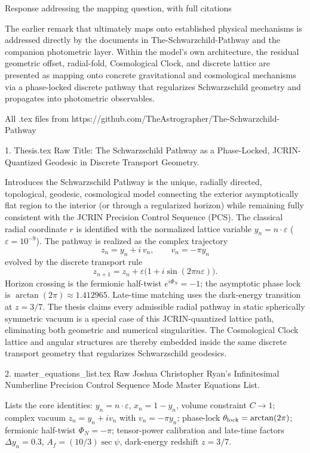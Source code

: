 Response addressing the mapping question, with full citations

The earlier remark that ultimately maps onto established physical mechanisms is addressed directly by the documents in The-Schwarzchild-Pathway and the companion photometric layer. Within the model’s own architecture, the residual geometric offset, radial-fold, Cosmological Clock, and discrete lattice are presented as mapping onto concrete gravitational and cosmological mechanisms via a phase-locked discrete pathway that regularizes Schwarzschild geometry and propagates into photometric observables.

All .tex files from https://github.com/TheAstrographer/The-Schwarzchild-Pathway

1. Thesis.tex  
Raw  
Title: The Schwarzschild Pathway as a Phase-Locked, JCRIN-Quantized Geodesic in Discrete Transport Geometry.  

Introduces the Schwarzschild Pathway is the unique, radially directed, topological, geodesic, cosmological model connecting the exterior asymptotically flat region to the interior (or through a regularized horizon) while remaining fully consistent with the JCRIN Precision Control Sequence (PCS). The classical radial coordinate \(r\) is identified with the normalized lattice variable \(y_n = n\cdot\varepsilon\) (\(\varepsilon=10^{-9}\)). The pathway is realized as the complex trajectory  
\[
z_n = y_n + i\,v_n,\qquad v_n = -\pi y_n
\]  
evolved by the discrete transport rule  
\[
z_{n+1} = z_n + \varepsilon\bigl(1 + i\sin(2\pi n\varepsilon)\bigr).
\]  
Horizon crossing is the fermionic half-twist \(e^{i\Phi_N}=-1\); the asymptotic phase lock is \(\arctan(2\pi)\approx1.412965\). Late-time matching uses the dark-energy transition at \(z=3/7\). The thesis claims every admissible radial pathway in static spherically symmetric vacuum is a special case of this JCRIN-quantized lattice path, eliminating both geometric and numerical singularities. The Cosmological Clock lattice and angular structures are thereby embedded inside the same discrete transport geometry that regularizes Schwarzschild geodesics.

2. master_equations_list.tex  
Raw  
Joshua Christopher Ryan's Infinitesimal Numberline Precision Control Sequence Mode Master Equations List.  

Lists the core identities:  
\(y_n = n\cdot\varepsilon\), \(x_n=1-y_n\), volume constraint \(C\to1\);  
complex vacuum \(z_n=y_n+i v_n\) with \(v_n=-\pi y_n\);  
phase-lock \(\theta_{\rm lock}=\arctan(2\pi)\);  
fermionic half-twist \(\Phi_N=-\pi\);  
tensor-power calibration and late-time factors \(\Delta y_n=0.3\), \(A_f=(10/3)\sec\psi\), dark-energy redshift \(z=3/7\).  

